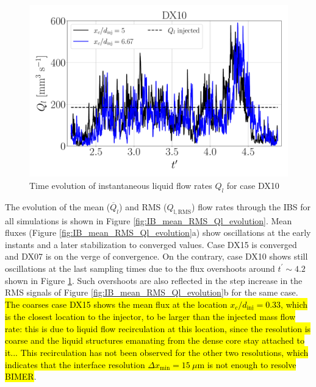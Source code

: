 \begin{figure}[ht]
	\centering
   \includegraphics[scale=0.222]{./part3_applications/figures_ch8_resolved/flow_rates_ibs/inst_Q_iso_x_DX10}
   \vspace*{-0.20in}
\caption{Time evolution of instantaneous liquid flow rates $Q_l$ for case DX10}
\label{fig:IB_liquid_flow_rate_inst_evolution_BIMER}
\end{figure}

The evolution of the mean ($\overline{Q}_l$) and RMS ($Q_\mathrm{l,\mathrm{RMS}}$) flow rates through the IBS for all simulations is shown in Figure \ref{fig:IB_mean_RMS_Ql_evolution}. Mean fluxes (Figure \ref{fig:IB_mean_RMS_Ql_evolution}a) show oscillations at the early instants and a later stabilization to converged values. Case DX15 is converged and DX07 is on the verge of convergence. On the contrary, case DX10 shows still oscillations at the last sampling times due to the flux overshoots around $t^\prime \sim 4.2$ shown in Figure \ref{fig:IB_liquid_flow_rate_inst_evolution_BIMER}. Such overshoots are also reflected in the step increase in the RMS signals of Figure \ref{fig:IB_mean_RMS_Ql_evolution}b for the same case. \hl{The coarses case DX15 shows the mean flux at the location $x_c/d_\mathrm{inj} = 0.33$, which is the closest location to the injector, to be larger than the injected mass flow rate: this is due to liquid flow recirculation at this location, since the resolution is coarse and the liquid structures emanating from the dense core stay attached to it... This recirculation has not been observed for the other two resolutions, which indicates that the interface resolution $\Delta x_\mathrm{min} = 15~\mu $m is not enough to resolve BIMER}.

